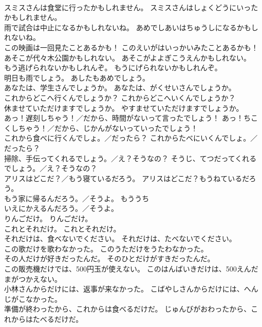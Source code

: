 \documentclass[8pt]{extreport}
\begin{document}
\begin{CJK}{UTF8}{min}
\\	スミスさんは食堂に行ったかもしれません。	スミスさんはしょくどうにいったかもしれません。 
\\	雨で試合は中止になるかもしれないね。	あめでしあいはちゅうしになるかもしれないね。 
\\	この映画は一回見たことあるかも！	このえいがはいっかいみたことあるかも！ 
\\	あそこが代々木公園かもしれない。	あそこがよよぎこうえんかもしれない。 
\\	もう逃げられないかもしれんぞ。	もうにげられないかもしれんぞ。 
\\	明日も雨でしょう。	あしたもあめでしょう。 
\\	あなたは、学生さんでしょうか。	あなたは、がくせいさんでしょうか。 
\\	これからどこへ行くんでしょうか？	これからどこへいくんでしょうか？ 
\\	休ませていただけますでしょうか。	やすませていただけますでしょうか。 
\\	あっ！遅刻しちゃう！／だから、時間がないって言ったでしょう！	あっ！ちこくしちゃう！／だから、じかんがないっていったでしょう！ 
\\	これから食べに行くんでしょ。／だったら？	これからたべにいくんでしょ。／だったら？ 
\\	掃除、手伝ってくれるでしょう。／え？そうなの？	そうじ、てつだってくれるでしょう。／え？そうなの？ 
\\	アリスはどこだ？／もう寝ているだろう。	アリスはどこだ？もうねているだろう。 
\\	もう家に帰るんだろう。／そうよ。	もう{うち
\\	いえ}にかえるんだろう。／そうよ。 
\\	りんごだけ。	りんごだけ。 
\\	これとそれだけ。	これとそれだけ。 
\\	それだけは、食べないでください。	それだけは、たべないでください。 
\\	この歌だけを歌わなかった。	このうただけをうたわなかった。 
\\	その人だけが好きだったんだ。	そのひとだけがすきだったんだ。 
\\	この販売機だけでは、500円玉が使えない。	このはんばいきだけは、500えんだまがつかえない。 
\\	小林さんからだけには、返事が来なかった。	こばやしさんからだけには、へんじがこなかった。 
\\	準備が終わったから、これからは食べるだけだ。	じゅんびがおわったから、これからはたべるだけだ。 

\end{CJK}
\end{document}
